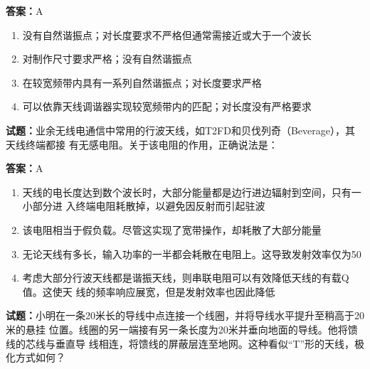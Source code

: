 \documentclass{ctexbook}
\begin{document}
\textbf{答案：}A 

\begin{enumerate}[leftmargin=3em]
  \item 没有自然谐振点；对长度要求不严格但通常需接近或大于一个波长 

  \item 对制作尺寸要求严格；没有自然谐振点 

  \item 在较宽频带内具有一系列自然谐振点；对长度要求严格 

  \item 可以依靠天线调谐器实现较宽频带内的匹配；对长度没有严格要求 

\end{enumerate}






\vspace{1em}

\textbf{试题：}业余无线电通信中常用的行波天线，如T2FD和贝伐列奇（Beverage），其天线终端都接
有无感电阻。关于该电阻的作用，正确说法是： 

\textbf{答案：}A 

\begin{enumerate}[leftmargin=3em]
  \item 天线的电长度达到数个波长时，大部分能量都是边行进边辐射到空间，只有一小部分进
入终端电阻耗散掉，以避免因反射而引起驻波 

  \item 该电阻相当于假负载。尽管这实现了宽带操作，却耗散了大部分能量 

  \item 无论天线有多长，输入功率的一半都会耗散在电阻上。这导致发射效率仅为50%

  \item 考虑大部分行波天线都是谐振天线，则串联电阻可以有效降低天线的有载Q值。这使天
线的频率响应展宽，但是发射效率也因此降低 

\end{enumerate}





\vspace{1em}

\textbf{试题：}小明在一条20米长的导线中点连接一个线圈，并将导线水平提升至稍高于20米的悬挂
位置。线圈的另一端接有另一条长度为20米并垂向地面的导线。他将馈线的芯线与垂直导
线相连，将馈线的屏蔽层连至地网。这种看似“T”形的天线，极化方式如何？ 
\end{document}
